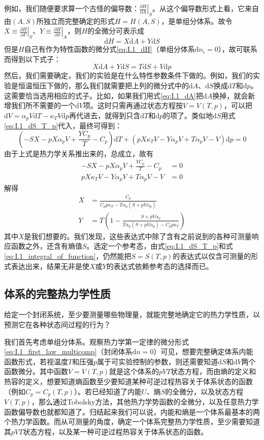 \documentclass[main.tex]{subfiles}
\begin{document}
例如，我们随便要求算一个古怪的偏导数：$\left.\frac{\partial H}{\partial A}\right|_{S}$。从这个偏导数形式上看，它来自由$\left(A,S\right)$所独立而完整确定的形式$H=H\left(A,S\right)$，是单组分体系。故令$X\equiv\left.\frac{\partial H}{\partial F}\right|_{S}$、$Y\equiv\left.\frac{\partial H}{\partial S}\right|_{A}$，则$H$的全微分可表示成
\[\mathrm{d}H=X\mathrm{d}A+Y\mathrm{d}S\]
但是$H$自己有作为特性函数的微分式\eqref{eq:I.1_dH}（单组分体系$\mathrm{d}n_i=0$），故可联系而得到以下式子：
\[X\mathrm{d}A+Y\mathrm{d}S=T\mathrm{d}S+V\mathrm{d}p\]
然后，我们需要确定，我们的实验是在什么特性参数条件下做的。例如，我们的实验是恒温恒压下做的，那么我们就需要把上列的微分式中的$\mathrm{d}A$、$\mathrm{d}S$换成$\mathrm{d}T$和$\mathrm{d}p$。这需要恰当选用相应的式子。比如，如果我们用式\eqref{eq:I.1_dA}把$\mathrm{d}A$换掉，就会新增我们所不需要的一个$\mathrm{d}V$项。这时只需再通过状态方程按$V=V\left(T,p\right)$，可以把$\mathrm{d}V=\alpha_pV\mathrm{d}T-\kappa_TV\mathrm{d}p$再代进去，就得到只含$\mathrm{d}T$和$\mathrm{d}p$的项了。类似地$\mathrm{d}S$用式\eqref{eq:I.1_dS_T_p}代入，最终可得到：
\[\left(-SX-pX\alpha_pV+\frac{YC_p}{T}-C_p\right)\mathrm{d}T+\left(pX\kappa_TV-Y\alpha_pV+T\alpha_pV-V\right)\mathrm{d}p=0\]
由于上式是热力学关系推出来的，总成立，故有
\begin{align*}
  -SX-pX\alpha_pV+\frac{YC_p}{T}-C_p  & =0 \\
  pX\kappa_TV-Y\alpha_pV+T\alpha_pV-V & =0
\end{align*}
解得
\begin{align*}
  X & =\frac{C_p}{C_p p \kappa_T-T\alpha_p\left(S+pV\alpha_p\right)}                          \\
  Y & =T\left(1-\frac{S+p V \alpha_p}{T\alpha_p\left(S+pV\alpha_p\right)-C_pp\kappa_T}\right)
\end{align*}
其中$X$是我们想要的。我们发现，这些表达式中除了含有之前说到的各种可测量响应函数之外，还含有熵值$S$。选定一个参考态，由式\eqref{eq:I.1_dS_T_p}和式\eqref{eq:I.1_integral_of_function}，仍然能把$S=S\left(T,p\right)$的表达式以仅含可测量的形式表达出来，结果无非是使$X$或$Y$的表达式依赖参考态的选择而已。

\subsection{体系的完整热力学性质}
给定一个封闭系统，至少要测量哪些物理量，就能完整地确定它的热力学性质，以预测它在各种状态间过程的行为？

我们首先考虑单组分体系。观察热力学第一定律的微分形式\eqref{eq:I.1_first_law_multicomp}（封闭体系$\mathrm{d}n=0$）可见，想要完整确定体系内能函数形式，若视温度$T$和压强$p$属于可实验控制的参数，则还需要知道$\mathrm{d}S$和$\mathrm{d}V$两个函数微分。其中函数$V=V\left(T,p\right)$就是这个体系的$pVT$状态方程，而由熵的定义和热容的定义，想要知道熵函数至少要知道某种可逆过程热容关于体系状态的函数（例如$C_p=C_p\left(T,p\right)$）。若已经知道了内能$U$、熵$S$的全微分，以及状态方程$V\left(T,p\right)$，那么通过Tobolsky方法，其他热力学势函数的全微分，以及任意热力学函数偏导数也就都知道了。归结起来我们可以说，内能和熵是一个体系最基本的两个热力学函数。而从可测量的角度，确定一个体系完整热力学性质，至少需要知道其$pVT$状态方程，以及某一种可逆过程热容关于体系状态的函数。
\end{document}
